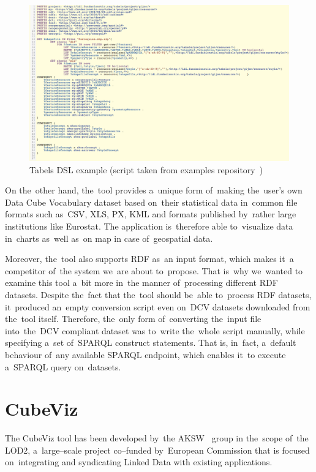 \begin{figure}
	\centering
	\includegraphics[width=140mm]{img/tabels.png}
	\caption{Tabels DSL example (script taken from examples repository~\cite{tabels-web})}
	\label{fig:tabels}
\end{figure}

On the~other hand, the~tool provides a~unique form of~making the~user's own Data Cube 
Vocabulary dataset based on~their statistical data in~common file formats such as~CSV, XLS, PX, KML and formats published by~rather large institutions like Eurostat. 
The application is~therefore able to~visualize data in~charts as~well as~on map 
in case of~geospatial data.

Moreover, the~tool also supports RDF as~an input format, which makes it~a 
competitor of~the system we~are about to~propose. That is~why we~wanted
to examine this tool a~bit more in~the manner of~processing different RDF 
datasets. Despite the~fact that the~tool should be~able to~process RDF 
datasets, it~produced an~empty conversion script even on~DCV datasets downloaded 
from the~tool itself. Therefore, the~only form of~converting the~input file into~the~DCV compliant dataset was to~write the~whole script manually, while 
specifying a~set of~SPARQL construct statements. That is, in~fact, a~default 
behaviour of~any available SPARQL endpoint, which enables it~to execute a~SPARQL 
query on~datasets.

\section{CubeViz}
\label{cubeviz}
The CubeViz tool has been developed by~the AKSW~\cite{aksw} group
in the~scope of~the LOD2,
a~large--scale project co--funded by~European Commission that is
focused on~integrating and syndicating Linked Data with existing applications.

